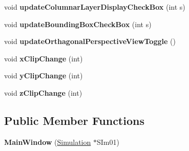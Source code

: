 \begin{DoxyCompactItemize}
\item 
\hypertarget{classMainWindow_a516111157b177a92fc5838a060f36908}{}void {\bfseries update\+Columnar\+Layer\+Display\+Check\+Box} (int s)\label{classMainWindow_a516111157b177a92fc5838a060f36908}

\item 
\hypertarget{classMainWindow_a52aa21a413bbc1f33a84f695b677f490}{}void {\bfseries update\+Bounding\+Box\+Check\+Box} (int s)\label{classMainWindow_a52aa21a413bbc1f33a84f695b677f490}

\item 
\hypertarget{classMainWindow_af2c325c24155eb2198ef705d78d452d8}{}void {\bfseries update\+Orthagonal\+Perspective\+View\+Toggle} ()\label{classMainWindow_af2c325c24155eb2198ef705d78d452d8}

\item 
\hypertarget{classMainWindow_ab677ef1bf70bc78faa5680576c14cd22}{}void {\bfseries x\+Clip\+Change} (int)\label{classMainWindow_ab677ef1bf70bc78faa5680576c14cd22}

\item 
\hypertarget{classMainWindow_a019023e11d09610ad8632baeb6854c61}{}void {\bfseries y\+Clip\+Change} (int)\label{classMainWindow_a019023e11d09610ad8632baeb6854c61}

\item 
\hypertarget{classMainWindow_af30a90f508a3d0b4434ddcaf848c69ac}{}void {\bfseries z\+Clip\+Change} (int)\label{classMainWindow_af30a90f508a3d0b4434ddcaf848c69ac}

\end{DoxyCompactItemize}
\subsection*{Public Member Functions}
\begin{DoxyCompactItemize}
\item 
\hypertarget{classMainWindow_aa1c3a3a33e1e67e055b8448ad9a9e208}{}{\bfseries Main\+Window} (\hyperlink{classSimulation}{Simulation} $\ast$S\+Im01)\label{classMainWindow_aa1c3a3a33e1e67e055b8448ad9a9e208}

\end{DoxyCompactItemize}
